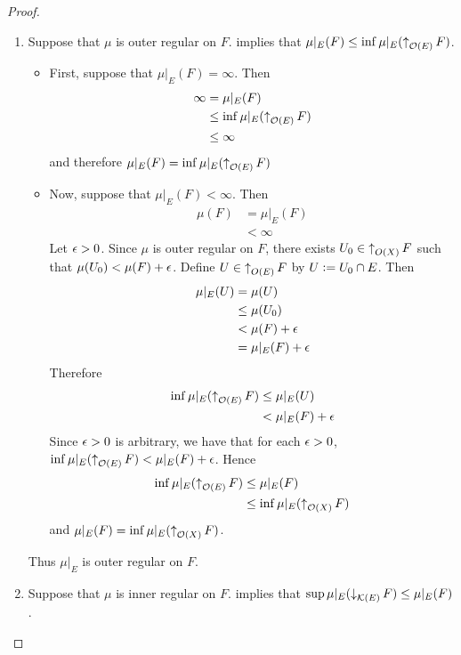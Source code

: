 \documentclass{book}
\begin{document}
	\begin{proof}\
		\begin{enumerate}
			\item Suppose that $\mu$ is outer regular on $F$.  implies that $\mu|_E(F) \leq \inf \mu|_E(\operatorname{\uparrow}_{\mathcal{O}(E)}F)$.
			\begin{itemize}
				\item First, suppose that $\mu|_E(F) = \infty$. Then 
				\begin{align*}
					\infty
					& = \mu|_E(F) \\
					& \leq \inf \mu|_E(\operatorname{\uparrow}_{\mathcal{O}(E)} F) \\
					& \leq \infty
				\end{align*}
				and therefore $\mu|_E(F) = \inf \mu|_E(\operatorname{\uparrow}_{\mathcal{O}(E)} F)$
				\item Now, suppose that $\mu|_E(F) < \infty$. Then 
				\begin{align*}
					\mu(F)
					& = \mu|_E(F) \\
					& < \infty
				\end{align*}
				Let $\epsilon > 0$. Since $\mu$ is outer regular on $F$, there exists $U_0 \in \operatorname{\uparrow}_{O(X)}F$ such that $\mu(U_0) < \mu(F) + \epsilon$. Define $U \in \operatorname{\uparrow}_{O(E)} F$ by $U \vcentcolon= U_0 \cap E$. Then
				\begin{align*}
					\mu|_E(U)
					& = \mu(U) \\
					& \leq \mu(U_0) \\
					& < \mu(F) + \epsilon \\
					& = \mu|_E(F) + \epsilon
				\end{align*}
				Therefore
				\begin{align*}
					\inf \mu|_E(\operatorname{\uparrow}_{\mathcal{O}(E)} F)
					& \leq \mu|_E(U) \\
					& < \mu|_E(F) + \epsilon
				\end{align*}
				Since $\epsilon > 0$ is arbitrary, we have that for each $\epsilon >0$, $\inf \mu|_E(\operatorname{\uparrow}_{\mathcal{O}(E)} F) < \mu|_E(F) + \epsilon$. Hence  
				\begin{align*}
					\inf \mu|_E(\operatorname{\uparrow}_{\mathcal{O}(E)} F) 
					& \leq \mu|_E(F) \\
					& \leq \inf \mu|_E(\operatorname{\uparrow}_{\mathcal{O}(X)} F) 
				\end{align*}
				and $\mu|_E(F) = \inf \mu|_E(\operatorname{\uparrow}_{\mathcal{O}(X)} F)$.
				\end{itemize}
				Thus $\mu|_E$ is outer regular on $F$.
			\item Suppose that $\mu$ is inner regular on $F$.  implies that $\sup \mu|_E(\operatorname{\downarrow}_{\mathcal{K}(E)} F) \leq \mu|_E(F)$. 

\end{enumerate}
\end{proof}
\end{document}

